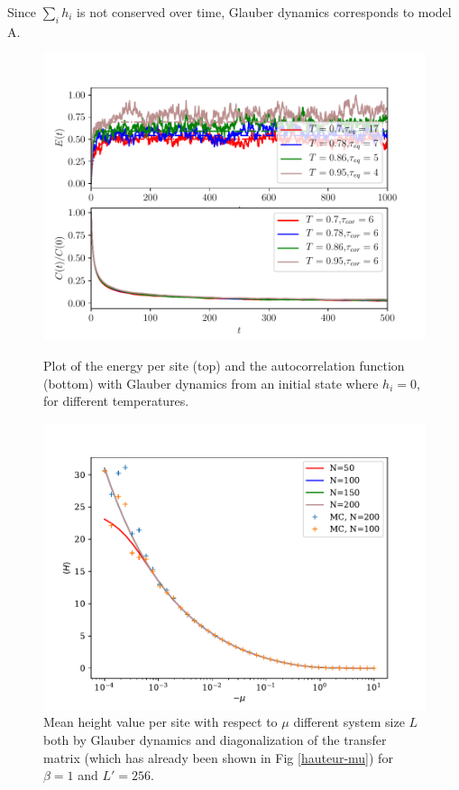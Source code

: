 Since $\sum_i h_i$ is not conserved over time, Glauber dynamics corresponds to model A.

\begin{figure}
\centering
\includegraphics[scale=1]{numerical/sos-glau-eq-cor.pdf}
\caption{Plot of the energy per site (top) and the autocorrelation function (bottom) with Glauber dynamics from an initial state where $h_i=0$, for different temperatures.}
\label{eq-glau}
\includegraphics[scale=0.5]{numerical/comp-mc-tm-mu.pdf}
\caption{Mean height value per site with respect to $\mu$ different system size $L$ both by Glauber dynamics and diagonalization of the transfer matrix (which has already been shown in Fig \ref{hauteur-mu}) for $\beta=1$ and $L' = 256$.}
\label{tm-mc-equalt} 
\end{figure}
